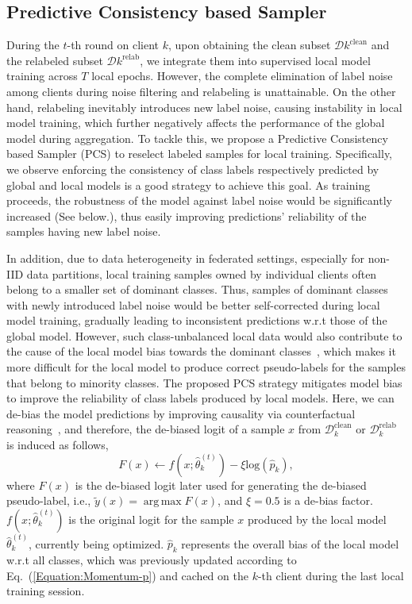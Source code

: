 \documentclass[letterpaper]{article} %
\DeclareMathOperator*{\argmax}{arg\,max}
\begin{document}
\subsection{Predictive Consistency based Sampler}

During the $t$-th round on client $k$, upon obtaining the clean subset $\mathcal{D}{k}^{\text{clean}}$ and the relabeled subset $\mathcal{D}{k}^{\text{relab}}$, we integrate them into supervised local model training across $T$ local epochs. However, the complete elimination of label noise among clients during noise filtering and relabeling is unattainable. On the other hand, relabeling inevitably introduces new label noise, causing instability in local model training, which further negatively affects the performance of the global model during aggregation. To tackle this, we propose a Predictive Consistency based Sampler (PCS) to reselect labeled samples for local training. Specifically, we observe enforcing the consistency of class labels respectively predicted by global and local models is a good strategy to achieve this goal. As training proceeds, the robustness of the model against label noise would be significantly increased (See below.), thus easily improving predictions' reliability of the samples having new label noise.


In addition, due to data heterogeneity in federated settings, especially for non-IID data partitions, local training samples owned by individual clients often belong to a smaller set of dominant classes. Thus, samples of dominant classes with newly introduced label noise would be better self-corrected during local model training, gradually leading to inconsistent predictions w.r.t those of the global model.
However, such class-unbalanced local data would also contribute to the cause of the local model bias towards the dominant classes~\cite{imbalance}, which makes it more difficult for the local model to produce correct pseudo-labels for the samples that belong to minority classes. The proposed PCS strategy mitigates model bias to improve the reliability of class labels produced by local models. Here, we can de-bias the model predictions by improving causality via counterfactual reasoning~\cite{holland1986statistics, pearl2009causal, debiasedlearning}, and therefore, the de-biased logit of a sample $x$ from $\mathcal{D}_{k}^{\text{clean}}$ or $\mathcal{D}_{k}^{\text{relab}}$ is induced as follows,
\begin{equation}
    \label{Equation:Logit-Debias}
     F(x) \leftarrow f(x;\hat{{\theta}}_k^{(t)}) -\xi  \text{log} (\hat{p}_{k}),
\end{equation}
where $F(x)$ is the de-biased logit later used for generating the de-biased pseudo-label, i.e., $\tilde{y}(x) = \argmax F(x)$, and $\xi =0.5$ is a de-bias factor. $f(x;\hat{{\theta}}_k^{(t)})$ is the original logit for the sample $x$ produced by the local model $\hat{{\theta}}_k^{(t)}$, currently being optimized. $\hat{p}_{k}$ represents the overall bias of the local model w.r.t all classes, which was previously updated according to Eq.~(\ref{Equation:Momentum-p}) and cached on the $k$-th client during the last local training session.
\end{document}
